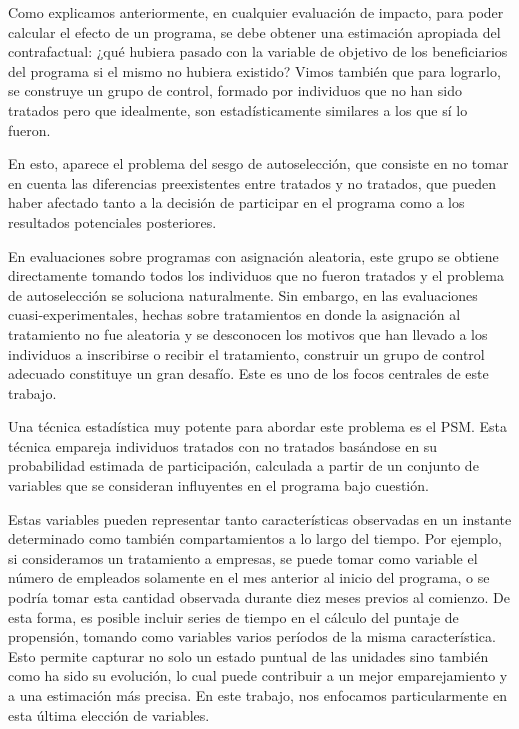\documentclass[../main.tex]{subfiles}
\begin{document}
Como explicamos anteriormente, en cualquier evaluación de impacto, para poder calcular el
efecto de un programa, se debe obtener una estimación apropiada del contrafactual: ¿qué
hubiera pasado con la variable de objetivo de los beneficiarios del programa si el mismo
no hubiera existido? Vimos también que para lograrlo, se construye un grupo de control,
formado por individuos que no han sido tratados pero que idealmente, son estadísticamente
similares a los que sí lo fueron.

En esto, aparece el problema del sesgo de autoselección, que consiste en no tomar en
cuenta las diferencias preexistentes entre tratados y no tratados, que pueden haber
afectado tanto a la decisión de participar en el programa como a los resultados
potenciales posteriores.

En evaluaciones sobre programas con asignación aleatoria, este grupo se obtiene
directamente tomando todos los individuos que no fueron tratados y el problema de
autoselección se soluciona naturalmente. Sin embargo, en las evaluaciones
cuasi-experimentales, hechas sobre tratamientos en donde la asignación al tratamiento no
fue aleatoria y se desconocen los motivos que han llevado a los individuos a inscribirse o
recibir el tratamiento, construir un grupo de control adecuado constituye un gran desafío.
Este es uno de los focos centrales de este trabajo.

Una técnica estadística muy potente para abordar este problema es el PSM. Esta técnica
empareja individuos tratados con no tratados basándose en su probabilidad estimada de
participación, calculada a partir de un conjunto de variables que se consideran
influyentes en el programa bajo cuestión.

Estas variables pueden representar tanto características observadas en un instante
determinado como también compartamientos a lo largo del tiempo. Por ejemplo, si
consideramos un tratamiento a empresas, se puede tomar como variable el número de
empleados solamente en el mes anterior al inicio del programa, o se podría tomar esta
cantidad observada durante diez meses previos al comienzo. De esta forma, es posible
incluir series de tiempo en el cálculo del puntaje de propensión, tomando como variables
varios períodos de la misma característica. Esto permite capturar no solo un estado
puntual de las unidades sino también como ha sido su evolución, lo cual puede contribuir
a un mejor emparejamiento y a una estimación más precisa. En este trabajo, nos enfocamos
particularmente en esta última elección de variables.
\end{document}
